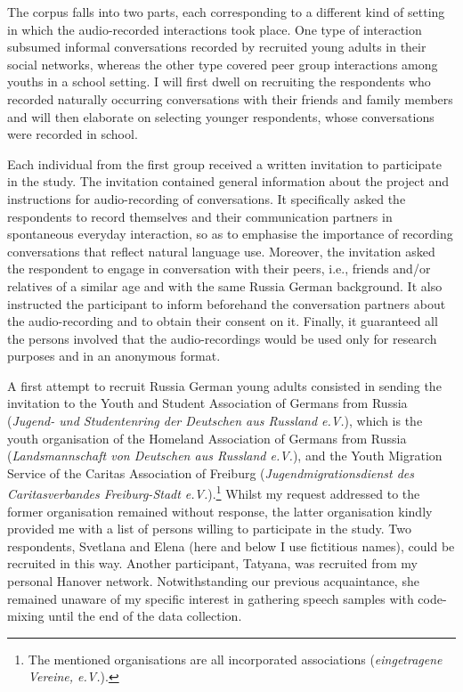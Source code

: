 The corpus falls into two parts, each corresponding to a different kind of setting in which the audio-recorded interactions took place. One type of interaction subsumed informal conversations recorded by recruited young adults in their social networks, whereas the other type covered peer group interactions among youths in a school setting. I will first dwell on recruiting the respondents who recorded naturally occurring conversations with their friends and family members and will then elaborate on selecting younger respondents, whose conversations were recorded in school.

Each individual from the first group received a written invitation to participate in the study. The invitation contained general information about the project and instructions for audio-recording of conversations. It specifically asked the respondents to record themselves and their communication partners in spontaneous everyday interaction, so as to emphasise the importance of recording conversations that reflect natural language use. Moreover, the invitation asked the respondent to engage in conversation with their peers, i.e., friends and/or relatives of a similar age and with the same Russia German background. It also instructed the participant to inform beforehand the conversation partners about the audio-recording and to obtain their consent on it. Finally, it guaranteed all the persons involved that the audio-recordings would be used only for research purposes and in an anonymous format.

A first attempt to recruit Russia German young adults consisted in sending the invitation to the Youth and Student Association of Germans from Russia (\textit{Jugend- und Studentenring der Deutschen aus Russland e.V.}), which is the youth organisation of the Homeland Association of Germans from Russia (\textit{Landsmannschaft von Deutschen aus Russland e.V.}), and the Youth Migration Service of the Caritas Association of Freiburg (\textit{Jugendmigrationsdienst des Caritasverbandes Freiburg-Stadt e.V.}).\footnote{The mentioned organisations are all incorporated associations (\textit{eingetragene Vereine, e.V.}).} Whilst my request addressed to the former organisation remained without response, the latter organisation kindly provided me with a list of persons willing to participate in the study. Two respondents, Svetlana and Elena (here and below I use fictitious names), could be recruited in this way. Another participant, Tatyana, was recruited from my personal Hanover network. Notwithstanding our previous acquaintance, she remained unaware of my specific interest in gathering speech samples with code-mixing until the end of the data collection.

